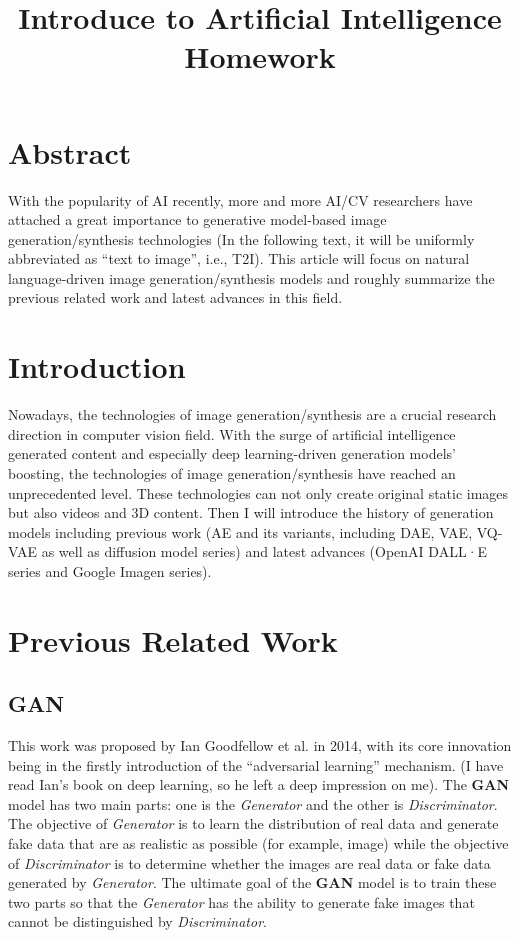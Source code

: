 \documentclass{article}
\title{Introduce to Artificial Intelligence Homework}
\author{}
\date{}
\begin{document}
\maketitle

\section*{Abstract}

With the popularity of AI recently, more and more AI/CV researchers have attached a great importance to 
generative model-based image generation/synthesis technologies (In the following text, it will be uniformly 
abbreviated as ``text to image'', i.e., T2I). This article will focus on natural language-driven image 
generation/synthesis models and roughly summarize the previous related work and latest advances in this field.

\section*{Introduction}

Nowadays, the technologies of image generation/synthesis are a crucial research direction in computer vision 
field. With the surge of artificial intelligence generated content and especially deep learning-driven 
generation models' boosting, the technologies of image generation/synthesis have reached an unprecedented 
level. These technologies can not only create original static images but also videos and 3D content. Then I 
will introduce the history of generation models including previous work (AE and its variants, including DAE, 
VAE, VQ-VAE as well as diffusion model series) and latest advances (OpenAI DALL·E series and Google Imagen 
series).

\section{Previous Related Work}

\subsection{GAN}

This work was proposed by Ian Goodfellow et al. in 2014, with its core innovation being in the firstly 
introduction of the ``adversarial learning'' mechanism. (I have read Ian's book on deep learning, so he left 
a deep impression on me). The \textbf{GAN} model has two main parts: one is the \textit{Generator} and the 
other is \textit{Discriminator}. The objective of \textit{Generator} is to learn the distribution of real 
data and generate fake data that are as realistic as possible (for example, image) while the objective of 
\textit{Discriminator} is to determine whether the images are real data or fake data generated by 
\textit{Generator}. The ultimate goal of the \textbf{GAN} model is to train these two parts so that the 
\textit{Generator} has the ability to generate fake images that cannot be distinguished by 
\textit{Discriminator}.
\end{document}

